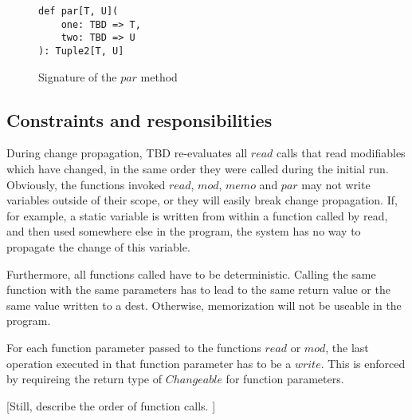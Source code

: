 \begin{figure}
\begin{lstlisting}[frame=single,basicstyle=\ttfamily]
def par[T, U](
    one: TBD => T, 
    two: TBD => U
): Tuple2[T, U] 
\end{lstlisting}
\caption{Signature of the $par$ method}
\label{code:par}
\end{figure}

\subsection{Constraints and responsibilities}

During change propagation, TBD re-evaluates all $read$ calls that read modifiables which have changed, in the same order they were called during the initial run. Obviously, the functions invoked $read$, $mod$, $memo$ and $par$ may not write variables outside of their scope, or they will easily break change propagation. If, for example, a static variable is written from within a function called by read, and then used somewhere else in the program, the system has no way to propagate the change of this variable.

Furthermore, all functions called have to be deterministic. Calling the same function with the same parameters has to lead to the same return value or the same value written to a dest. Otherwise, memorization will not be useable in the program.

For each function parameter passed to the functions $read$ or $mod$, the last operation executed in that function parameter has to be a $write$. This is enforced by requireing the return type of $Changeable$ for function parameters.  

[Still, describe the order of function calls. ]